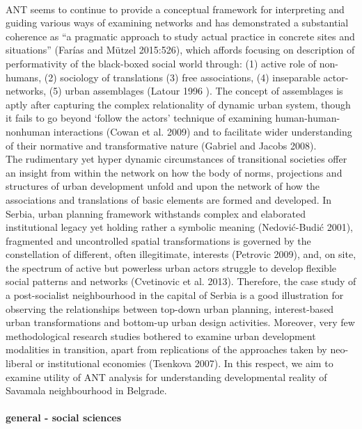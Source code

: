 \documentclass[11pt]{report}
\begin{document}
\\
ANT seems to continue to provide a conceptual framework for interpreting and guiding various ways of examining networks and has demonstrated a substantial coherence as “a pragmatic approach to study actual practice in concrete sites and situations” (Farías and Mützel 2015:526), which affords focusing on description of performativity of the black-boxed social world through: (1) active role of non-humans, (2) sociology of translations (3) free associations, (4) inseparable actor-networks, (5) urban assemblages (Latour 1996 ). The concept of assemblages is aptly after capturing the complex relationality of dynamic urban system, though it fails to go beyond ‘follow the actors’ technique of examining human-human-nonhuman interactions (Cowan et al. 2009) and to facilitate wider understanding of their normative and transformative nature (Gabriel and Jacobs 2008).
\\
The rudimentary yet hyper dynamic circumstances of transitional societies offer an insight from within the network on how the body of norms, projections and structures of urban development unfold and upon the network of how the associations and translations of basic elements are formed and developed. In Serbia, urban planning framework withstands complex and elaborated institutional legacy yet holding rather a symbolic meaning (Nedović-Budić 2001), fragmented and uncontrolled spatial transformations is governed by the constellation of different, often illegitimate, interests (Petrovic 2009), and, on site, the spectrum of active but powerless urban actors struggle to develop flexible social patterns and networks (Cvetinovic et al. 2013). Therefore, the case study of a post-socialist neighbourhood in the capital of Serbia is a good illustration for observing the relationships between top-down urban planning, interest-based urban transformations and bottom-up urban design activities. Moreover, very few methodological research studies bothered to examine urban  development modalities  in  transition,  apart  from  replications  of  the  approaches  taken  by  neo-liberal  or institutional economies (Tsenkova 2007). In this respect, we aim to examine utility of ANT analysis for understanding developmental reality of Savamala neighbourhood in Belgrade.

\paragraph{general - social sciences}
\end{document}
